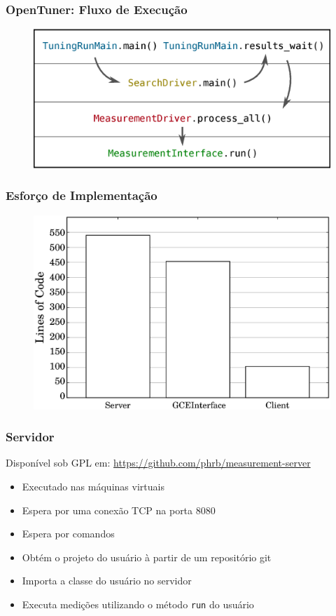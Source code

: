 \documentclass[10pt, compress]{beamer}
\begin{document}
\begin{frame}[fragile]
  \frametitle{OpenTuner: Fluxo de Execução}
  \begin{figure}[H]
      \centering
      \includegraphics[width=.8\textwidth]{opentunerflow_simple}
  \end{figure}
\end{frame}

\begin{frame}[fragile]
  \frametitle{Esforço de Implementação}
  \begin{figure}[H]
      \centering
      \includegraphics[width=1\textwidth]{loc_comparison}
  \end{figure}
\end{frame}

\begin{frame}[fragile]
    \frametitle{Servidor}
    Disponível sob GPL em:
    \url{https://github.com/phrb/measurement-server}
    \begin{itemize}
        \item Executado nas \alert{máquinas virtuais}
        \item Espera por uma \alert{conexão} TCP na porta 8080
        \item Espera por \alert{comandos}
        \item \alert{Obtém} o projeto do usuário à partir
            de um \alert{repositório git}
        \item \alert{Importa a classe} do usuário no servidor
        \item \alert{Executa medições} utilizando o método
            \texttt{run} do usuário
    \end{itemize}
\end{frame}
\end{document}
